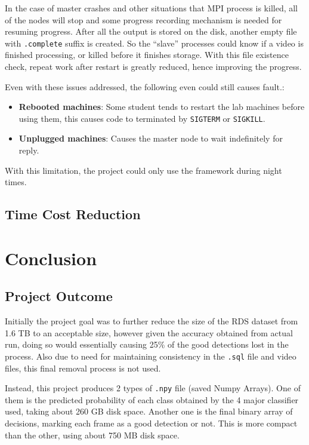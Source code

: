\documentclass[bsc,logo,twoside,fullspacing,parskip]{infthesis}
\begin{document}
In the case of master crashes and other situations that MPI process is killed, all of the nodes will stop and some progress recording mechanism is needed for resuming progress. After all the output is stored on the disk, another empty file with {\tt .complete} suffix is created. So the ``slave'' processes could know if a video is finished processing, or killed before it finishes storage. With this file existence check, repeat work after restart is greatly reduced, hence improving the progress.

Even with these issues addressed, the following even could still causes fault.:
\begin{itemize}
\setlength{\parskip}{0pt}
\item \textbf{Rebooted machines}: Some student tends to restart the lab machines before using them, this causes code to terminated by {\tt SIGTERM} or {\tt SIGKILL}.
\item \textbf{Unplugged machines}: Causes the master node to wait indefinitely for reply.
\end{itemize}
With this limitation, the project could only use the framework during night times.

\section{Time Cost Reduction} 


\newpage

\chapter{Conclusion}
\label{chap:conclusion}

\section{Project Outcome}

Initially the project goal was to further reduce the size of the RDS dataset from 1.6 TB to an acceptable size, however given the accuracy obtained from actual run, doing so would essentially causing 25\% of the good detections lost in the process. Also due to need for maintaining consistency in the {\tt .sql} file and video files, this final removal process is not used.

Instead, this project produces 2 types of {\tt .npy} file (saved Numpy Arrays). 
One of them is the predicted probability of each class obtained by the 4 major classifier used, taking about 260 GB disk space. 
Another one is the final binary array of decisions, marking each frame as a good detection or not. 
This is more compact than the other, using about 750 MB disk space.
\end{document}
